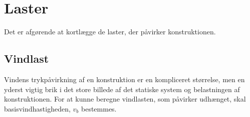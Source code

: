 \chapter{Laster} \label{sec:laster}

Det er afgørende at kortlægge de laster, der påvirker konstruktionen. 

\section{Vindlast}

Vindens trykpåvirkning af en konstruktion er en kompliceret størrelse, men en yderst vigtig brik i det store billede af det statiske system og belastningen af konstruktionen. For at kunne beregne vindlasten, som påvirker udhænget, skal basisvindhastigheden, $v_b$ bestemmes. 

